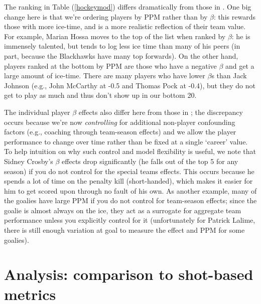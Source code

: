 The ranking in Table (\ref{hockeymod}) differs dramatically from those in
\cite{gramacy:jensen:taddy:2013}.  One big change here is that we're ordering
players by PPM rather than by $\beta$: this rewards those with more ice-time,
and is a more realistic reflection of their team value.  For example, Marian
Hossa moves to the top of the list when ranked by $\beta$: he is immensely
talented, but tends to log less ice time than many of his peers (in part,
because the Blackhawks have many top forwards).  On the other hand, players
ranked at the bottom by PPM are those who have a negative $\beta$ and get
a large amount of ice-time.  There are many players who have lower $\beta$s than
Jack Johnson (e.g., John McCarthy at -0.5 and Thomas Pock at -0.4), but they
do not get to play as much and thus don't show up in our bottom 20.

 The individual player
$\beta$ effects also differ here from those in
\cite{gramacy:jensen:taddy:2013}; the discrepancy occurs because we're now
\textit{controlling} for additional non-player confounding factors (e.g.,
coaching through team-season effects) and we allow the player performance to
change over time rather than be fixed at a single `career' value.   To help
intuition on why such control and model flexibility is useful, we note that
Sidney Crosby's $\beta$ effects drop significantly (he falls out of the top 5
for any season) if you do not control for the special teams effects.  This
occurs because he spends a lot of time on the penalty kill (short-handed),
which makes it easier for him to get scored upon through no fault of his own.
As another example, many of the goalies have large PPM if you do not control
for team-season effects; since the goalie is almost always on the ice, they
act as a surrogate for aggregate team performance unless you explicitly
control for it (unfortunately for Patrick Lalime, there is still enough
variation at goal to measure the effect and PPM for some goalies).

\section{Analysis: comparison to shot-based metrics}
\label{sec:shots}


